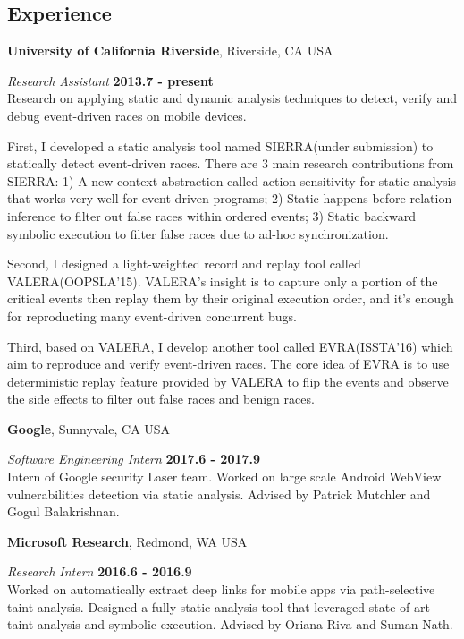 \documentclass[margin,line]{res}
\begin{document}
\begin{resume}
\section{\sc Experience}
{\bf University of California Riverside}, Riverside, CA USA

\vspace{-.3cm}
{\em Research Assistant} \hfill {\bf 2013.7 - present}\\
Research on applying static and dynamic analysis techniques to detect, verify and debug
event-driven races on mobile devices.

\vspace{-.3cm}
First, I developed a static analysis tool named SIERRA(under submission) to statically detect event-driven races.
There are 3 main research contributions from SIERRA: 1) A new context abstraction called action-sensitivity for
static analysis that works very well for event-driven programs; 2) Static happens-before relation inference
to filter out false races within ordered events; 3) Static backward symbolic execution to filter false races
due to ad-hoc synchronization.

\vspace{-.3cm}
Second, I designed a light-weighted record and replay tool called VALERA(OOPSLA'15).
VALERA's insight is to capture only a portion of the critical
events then replay them by their original execution order, 
and it's enough for reproducting many event-driven concurrent bugs.

\vspace{-.3cm}
Third, based on VALERA, I develop another tool called EVRA(ISSTA'16) which aim
to reproduce and verify event-driven races. The core idea of EVRA is to 
use deterministic replay feature provided by VALERA to flip the
events and observe the side effects to filter out false races and benign races.


{\bf Google}, Sunnyvale, CA USA

\vspace{-.3cm}
{\em Software Engineering Intern} \hfill {\bf 2017.6 - 2017.9}\\
Intern of Google security Laser team. Worked on large scale Android WebView vulnerabilities
detection via static analysis. Advised by Patrick Mutchler and Gogul Balakrishnan.

{\bf Microsoft Research}, Redmond, WA USA

\vspace{-.3cm}
{\em Research Intern} \hfill {\bf 2016.6 - 2016.9}\\
Worked on automatically extract deep links for mobile apps via path-selective taint analysis.
Designed a fully static analysis tool that leveraged state-of-art taint analysis and symbolic execution.
Advised by Oriana Riva and Suman Nath.


\end{resume}
\end{document}

